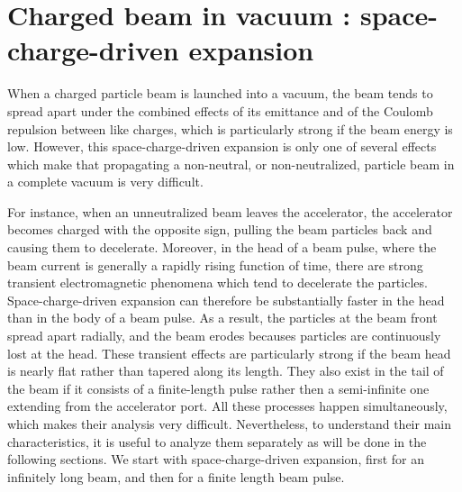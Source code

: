 \documentclass [12pt,a4paper,     ]{report} %
\begin{document}
\section{Charged beam in vacuum : space-charge-driven expansion}
\label{cha:0}

When a charged particle beam is launched into a vacuum, the beam tends to spread apart under the combined effects of its emittance and of the Coulomb repulsion between like charges, which is particularly strong if the beam energy is low.  However, this space-charge-driven expansion is only one of several effects which make that propagating a non-neutral, or non-neutralized, particle beam in a complete vacuum is very difficult.

For instance, when an unneutralized beam leaves the accelerator, the accelerator becomes charged with the opposite sign, pulling the beam particles back and causing them to decelerate.  Moreover, in the head of a beam pulse, where the beam current is generally a rapidly rising function of time, there are strong transient electromagnetic phenomena which tend to decelerate the particles. Space-charge-driven expansion can therefore be substantially faster in the head than in the body of a beam pulse.  As a result, the particles at the beam front spread apart radially, and the beam erodes becauses particles are continuously lost at the head.  These transient effects are particularly strong if the beam head is nearly flat rather than tapered along its length.  They also exist in the tail of the beam if it consists of a finite-length pulse rather then a semi-infinite one extending from the accelerator port.  All these processes happen simultaneously, which makes their analysis very difficult.  Nevertheless, to understand their main characteristics, it is useful to analyze them separately as will be done in the following sections.  We start with space-charge-driven expansion, first for an infinitely long beam, and then for a finite length beam pulse.
\end{document}
